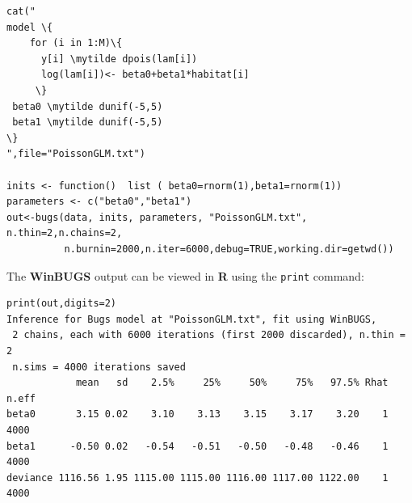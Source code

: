 {\small
\begin{Verbatim}[commandchars=\\\{\}] 
cat("
model \{
    for (i in 1:M)\{
      y[i] \mytilde dpois(lam[i])
      log(lam[i])<- beta0+beta1*habitat[i]
     \}
 beta0 \mytilde dunif(-5,5)
 beta1 \mytilde dunif(-5,5)
\}
",file="PoissonGLM.txt")

inits <- function()  list ( beta0=rnorm(1),beta1=rnorm(1))
parameters <- c("beta0","beta1")
out<-bugs(data, inits, parameters, "PoissonGLM.txt", n.thin=2,n.chains=2,
          n.burnin=2000,n.iter=6000,debug=TRUE,working.dir=getwd())
\end{Verbatim}



The {\bf WinBUGS} output can be viewed in {\bf R} using the {\tt print} command:
{\small
\begin{verbatim}
print(out,digits=2)
Inference for Bugs model at "PoissonGLM.txt", fit using WinBUGS,
 2 chains, each with 6000 iterations (first 2000 discarded), n.thin = 2
 n.sims = 4000 iterations saved
            mean   sd    2.5%     25%     50%     75%   97.5% Rhat n.eff
beta0       3.15 0.02    3.10    3.13    3.15    3.17    3.20    1  4000
beta1      -0.50 0.02   -0.54   -0.51   -0.50   -0.48   -0.46    1  4000
deviance 1116.56 1.95 1115.00 1115.00 1116.00 1117.00 1122.00    1  4000
\end{verbatim}
}

}

